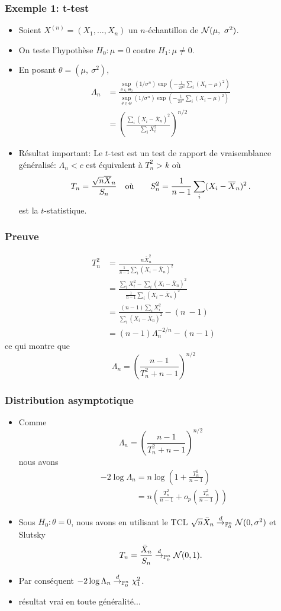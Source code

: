 \begin{frame}
\frametitle{Exemple 1: t-test}
\begin{itemize}
\item  Soient $X^{(n)}= (X_{1}, \dots, X_{n})$ un $n$-échantillon de $\mathcal{N}(\mu,\ \sigma^{2})$.
\item On teste l'hypothèse $H_0: \mu =0$ contre $H_1: \mu \ne 0$.
\item En posant $\theta=(\mu,\ \sigma^{2})$,
\begin{align*}
\Lambda_{n}&=\frac{\sup_{\theta\in\Theta_{0}}(1/\sigma^{n})\exp(-\frac{1}{2\sigma^{2}}\sum_{i}(X_{i}-\mu)^{2})}{\sup_{\theta\in\Theta}(1/\sigma^{n})\exp(-\frac{1}{2\sigma^{2}}\sum_{i}(X_{i}-\mu)^{2})}\\
&=\left( \frac{\sum_{i}(X_{i}-\overline{X}_{n})^{2}}{\sum_{i}X_{i}^{2}} \right)^{n/2}
\end{align*}
\item \alert{Résultat important:} Le $t$-test est un test de rapport de vraisemblance généralisé: $\Lambda_{n}<c$ est équivalent à $T_{n}^{2}>k$ où
$$
T_{n}=\frac{\sqrt{n}\overline{X}_{n}}{S_n}  \quad \text{où} \quad \quad S_n^2= \frac{1}{n-1}\sum_{i}(X_{i}-\overline{X}_{n})^{2} \,.
$$
est la $t$-statistique.
\end{itemize}
\end{frame}

\begin{frame}
\frametitle{Preuve}
\begin{align*}
T_{n}^{2} &=\frac{n\overline{X}_{n}^{2}}{\frac{1}{n-1}\sum_{i}(X_{i}-\overline{X}_{n})^{2}} \\
&=\frac{\sum_{i}X_{i}^{2}-\sum_{i}(X_{i}-\overline{X}_{n})^{2}}{\frac{1}{n-1}\sum_{i}(X_{i}-\overline{X}_{n})^{2}} \\
&=\frac{(n-1)\sum_{i}X_{i}^{2}}{\sum_{i}(X_{i}-\overline{X}_{n})^{2}}-(n\ -1) \\
&=(n-1)\Lambda_{n}^{-2/n}-(n-1)
\end{align*}
ce qui montre que
$$
\Lambda_{n}=\left(\frac{n-1}{T_{n}^{2}+n-1}\right)^{n/2}
$$
\end{frame}

\begin{frame}
\frametitle{Distribution asymptotique}
\begin{itemize}
\item Comme
$$
\Lambda_{n}=(\frac{n-1}{T_{n}^{2}+n-1})^{n/2}
$$
nous avons
\begin{align*}
&-2\log\Lambda_{n}=n\log\left(1+\frac{T_n^{2}}{n-1}\right) \\
&\phantom{-2\log\Lambda_{n}}=n \left(\frac{T_n^{2}}{n-1}+o_{p}(\frac{T_n^{2}}{n-1}) \right) 
\end{align*}
\item Sous $H_{0}: \theta= 0$,  nous avons en utilisant le TCL $\sqrt{n} \bar{X}_n \stackrel{d}{\rightarrow}_{\operatorname{{\mathbb P}}_0^n} \mathcal{N}(0,\sigma^2)$ et Slutsky
$$
T_{n} = \frac{\bar{X}_n}{S_n} \stackrel{d}{\rightarrow}_{\operatorname{{\mathbb P}}_0^n} \mathcal{N}(0,1).
$$
\item Par conséquent $-2 \log \Lambda_n \stackrel{d}{\rightarrow}_{\operatorname{{\mathbb P}}_0^n} \chi_{1}^{2}$.
\item \alert{résultat vrai en toute généralité...}
\end{itemize}
\end{frame}

